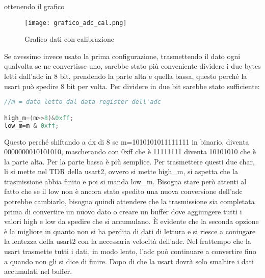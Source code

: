 \documentclass[main.tex]{subfiles}
\begin{document}
ottenendo il grafico 
\begin{figure}[H]
    \centering
    \texttt{[image: grafico\_adc\_cal.png]}
    \caption{Grafico dati con calibrazione}
    \label{fig:grafico_adc_cal}
\end{figure}

Se avessimo invece usato la prima configurazione, trasmettendo il dato ogni qualvolta se ne convertisse uno, sarebbe stato più conveniente dividere i due bytes letti dall'adc in 8 bit, prendendo la parte alta e quella bassa, questo perché la usart può spedire 8 bit per volta. 
Per dividere in due bit sarebbe stato sufficiente:
\begin{lstlisting}[caption= Divisione dei 2 byte da inviare, language=C]
//m = dato letto dal data register dell'adc

high_m=(m>>8)&0xff;
low_m=m & 0xff; 

\end{lstlisting}
Questo perché shiftando a dx di 8 se m=1010101011111111 in binario, diventa 0000000010101010, mascherando con 0xff che è 11111111 diventa 10101010 che è la parte alta. Per la parte bassa è più semplice.
Per trasmettere questi due char, li si mette nel TDR della usart2, ovvero si mette high\_m, si aspetta che la trasmissione abbia finito e poi si manda low\_m. Bisogna stare però attenti al fatto che se il low non è ancora stato spedito una nuova conversione dell'adc potrebbe cambiarlo, bisogna quindi attendere che la trasmissione sia completata prima di convertire un nuovo dato o creare un buffer dove aggiungere tutti i valori high e low da spedire che si accumulano. È evidente che la seconda opzione è la migliore in quanto non si ha perdita di dati di lettura e si riesce a coniugare la lentezza della usart2 con la necessaria velocità dell'adc. Nel frattempo che la usart trasmette tutti i dati, in modo lento, l'adc può continuare a convertire fino a quando non gli si dice di finire. Dopo di che la usart dovrà solo smaltire i dati accumulati nel buffer. 
\end{document}
